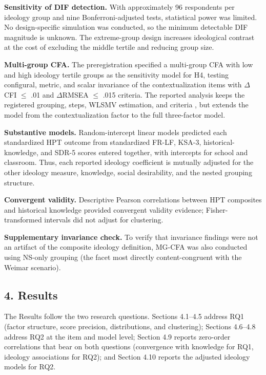 \documentclass[
  12pt,
]{article}
\newcommand{\Loc}[1]{\linelabel{loc:#1}}
\newcommand{\LocEnd}[1]{\linelabel{loc:#1:end}}
\begin{document}
\textbf{Sensitivity of DIF detection.} With approximately 96 respondents per ideology group and nine Bonferroni-adjusted tests, statistical power was limited. No design-specific simulation was conducted, so the minimum detectable DIF magnitude is unknown. The extreme-group design increases ideological contrast at the cost of excluding the middle tertile and reducing group size.

\textbf{Multi-group CFA.} The preregistration specified a multi-group CFA with low and high ideology tertile groups as the sensitivity model for H4, testing configural, metric, and scalar invariance of the contextualization items with \(\Delta\)CFI \(\leq\) .01 and \(\Delta\)RMSEA \(\leq\) .015 criteria. The reported analysis keeps the registered grouping, steps, WLSMV estimation, and criteria \citep{Chen2007,Cheung2002}, but extends the model from the contextualization factor to the full three-factor model.

\textbf{Substantive models.} Random-intercept linear models predicted each
standardized HPT outcome from standardized FR-LF, KSA-3, historical-knowledge,
and SDR-5 scores entered together, with intercepts for school and classroom.
Thus, each reported ideology coefficient is mutually adjusted for the other
ideology measure, knowledge, social desirability, and the nested grouping
structure.

\textbf{Convergent validity.} Descriptive Pearson correlations between HPT composites and historical knowledge provided convergent validity evidence; Fisher-transformed intervals did not adjust for clustering.

\textbf{Supplementary invariance check.} To verify that invariance findings were not an artifact of the composite ideology definition, MG-CFA was also conducted using NS-only grouping (the facet most directly content-congruent with the Weimar scenario).

\hypertarget{results}{%
\subsection{4. Results}\label{results}}

\Loc{results-roadmap}The Results follow the two research questions. Sections 4.1--4.5 address
RQ1 (factor structure, score precision, distributions, and clustering);
Sections 4.6--4.8 address RQ2 at the item and model level; Section 4.9 reports
zero-order correlations that bear on both questions (convergence with
knowledge for RQ1, ideology associations for RQ2); and Section 4.10 reports the
adjusted ideology models for RQ2.\LocEnd{results-roadmap}
\end{document}
